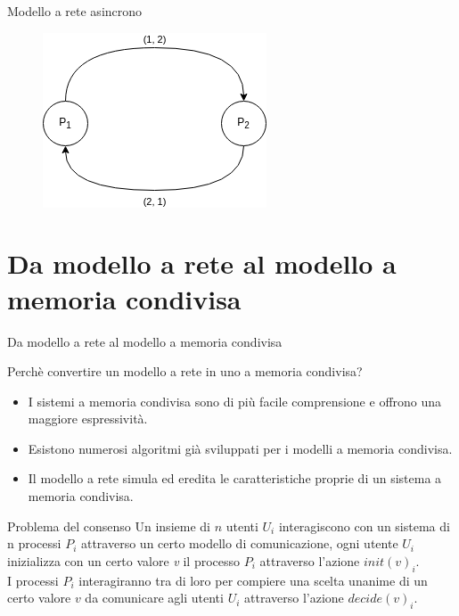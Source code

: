 \documentclass{beamer}
\begin{document}
\begin{frame}{Modello a rete asincrono}
\begin{textblock*}{0.3\textwidth}
\begin{block}{}
    \begin{figure}
        \centering
        \includegraphics[scale=0.4]{modello_a_rete_digrafo.png}
    \end{figure}
    \end{block}
\end{textblock*}
\end{frame}

\section{Da modello a rete al modello a memoria condivisa}

\begin{frame}{Da modello a rete al modello a memoria condivisa}
    \begin{block}{Perchè convertire un modello a rete in uno a memoria condivisa?}
        \begin{itemize}
            \item I sistemi a memoria condivisa sono di più facile comprensione e offrono una maggiore espressività.
            \item Esistono numerosi algoritmi già sviluppati per i modelli a memoria condivisa.
            \item Il modello a rete simula ed eredita le caratteristiche proprie di un sistema a memoria condivisa.
        \end{itemize}
    \end{block}
\end{frame}

\begin{frame}{Problema del consenso}
    Un insieme di $n$ utenti $U_{i}$ interagiscono con un sistema di n processi $P_{i}$ attraverso un certo modello di comunicazione, ogni utente $U_{i}$ inizializza con un certo valore \textit{v} il processo $P_{i}$ attraverso l'azione $init(v)_{i}$.
    \\[10pt]
    I processi $P_{i}$ interagiranno tra di loro per compiere una scelta unanime di un certo valore $v$ da comunicare agli utenti $U_{i}$ attraverso l'azione $decide(v)_{i}$.
    

\end{frame}
\end{document}

